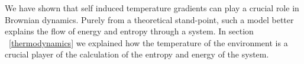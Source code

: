 We have shown that self induced temperature gradients can play a crucial role in Brownian dynamics. Purely from a theoretical stand-point, such a model better explains the flow of energy and entropy through a system. In section ~\autoref{thermodynamics} we explained how the temperature of the environment is a crucial player of the calculation of the entropy and energy of the system.
